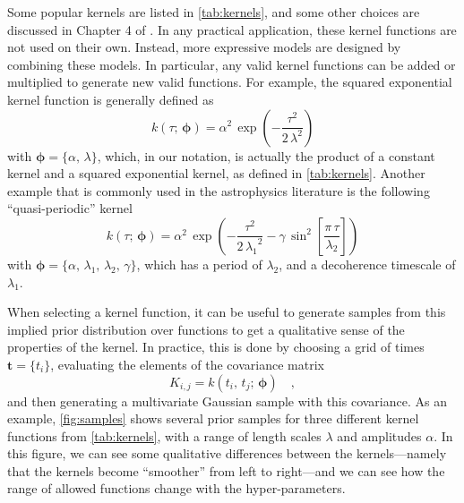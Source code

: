 \documentclass[letterpaper]{ar-1col}
\newcommand{\hyperparams}{\ensuremath{\boldsymbol{\phi}}}
\newcommand{\dt}{\ensuremath{\tau}}
\newcommand{\amplitude}{\ensuremath{\alpha}}
\newcommand{\lengthscale}{\ensuremath{\lambda}}
\begin{document}
Some popular kernels are listed in \autoref{tab:kernels}, and some other choices are discussed in Chapter 4 of \citet{gpml}.
In any practical application, these kernel functions are not used on their own.
Instead, more expressive models are designed by combining these models.
In particular, any valid kernel functions can be added or multiplied to generate new valid functions.
For example, the squared exponential kernel function is generally defined as
\begin{equation}
  k(\dt;\,\hyperparams) = \amplitude^2\,\exp\left(-\frac{\dt^2}{2\,\lengthscale^2}\right)
\end{equation}
with $\hyperparams = \{\amplitude,\,\lengthscale\}$, which, in our notation, is actually the product of a constant kernel and a squared exponential kernel, as defined in \autoref{tab:kernels}.
Another example that is commonly used in the astrophysics literature \citep{2012MNRAS.419.3147A,2014MNRAS.443.2517H} is the following ``quasi-periodic'' kernel
\begin{equation}
  k(\dt;\,\hyperparams) = \amplitude^2\,\exp\left(-\frac{\dt^2}{2\,{\lengthscale_1}^2} -\gamma\,\sin^2\left[\frac{\pi\,\dt}{\lengthscale_2}\right] \right)
\end{equation}
with $\hyperparams = \{\amplitude,\,\lengthscale_1,\,\lengthscale_2,\,\gamma\}$, which has a period of $\lengthscale_2$, and a decoherence timescale of $\lengthscale_1$.

When selecting a kernel function, it can be useful to generate samples from this implied prior distribution over functions to get a qualitative sense of the properties of the kernel.
In practice, this is done by choosing a grid of times $\boldsymbol{t} = \{t_i\}$, evaluating the elements of the covariance matrix
\begin{equation}
  K_{i,j} = k(t_i,\,t_j;\,\hyperparams) \quad,
\end{equation}
and then generating a multivariate Gaussian sample with this covariance.
As an example, \autoref{fig:samples} shows several prior samples for three different kernel functions from \autoref{tab:kernels}, with a range of length scales $\lengthscale$ and amplitudes $\amplitude$.
In this figure, we can see some qualitative differences between the kernels---namely that the kernels become ``smoother'' from left to right---and we can see how the range of allowed functions change with the hyper-parameters.
\end{document}

